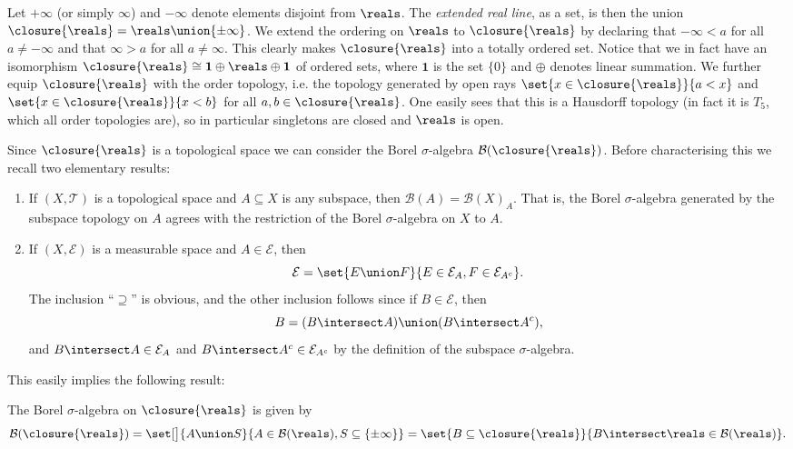 \documentclass[article, a4paper, 11pt, oneside]{memoir}
\numberwithin{equation}{chapter}
\newcommand{\calT}{\mathcal{T}}
\newcommand{\calE}{\mathcal{E}}
\newcommand{\borel}{\mathcal{B}}
\newcommand{\exreals}{\closure{\reals}}
\begin{document}
Let $+\infty$ (or simply $\infty$) and $-\infty$ denote elements disjoint from $\reals$. The \emph{extended real line}, as a set, is then the union $\exreals = \reals \union \{\pm\infty\}$. We extend the ordering on $\reals$ to $\exreals$ by declaring that $-\infty < a$ for all $a \neq -\infty$ and that $\infty > a$ for all $a \neq \infty$. This clearly makes $\exreals$ into a totally ordered set. Notice that we in fact have an isomorphism $\exreals \cong \mathbf{1} \oplus \reals \oplus \mathbf{1}$ of ordered sets, where $\mathbf{1}$ is the set $\{0\}$ and $\oplus$ denotes linear summation. We further equip $\exreals$ with the order topology, i.e. the topology generated by open rays $\set{x \in \exreals}{a < x}$ and $\set{x \in \exreals}{x < b}$ for all $a,b \in \exreals$. One easily sees that this is a Hausdorff topology (in fact it is $T_5$, which all order topologies are), so in particular singletons are closed and $\reals$ is open.

Since $\exreals$ is a topological space we can consider the Borel $\sigma$-algebra $\borel(\exreals)$. Before characterising this we recall two elementary results:
%
\begin{enumerate}
    \item If $(X,\calT)$ is a topological space and $A \subseteq X$ is any subspace, then $\borel(A) = \borel(X)_A$. That is, the Borel $\sigma$-algebra generated by the subspace topology on $A$ agrees with the restriction of the Borel $\sigma$-algebra on $X$ to $A$.

    \item If $(X,\calE)$ is a measurable space and $A \in \calE$, then
    \begin{equation*}
        \calE
            = \set{E \union F}{E \in \calE_A, F \in \calE_{A^c}}.
    \end{equation*}
    The inclusion \enquote{$\supseteq$} is obvious, and the other inclusion follows since if $B \in \calE$, then
    \begin{equation*}
        B
            = (B \intersect A) \union (B \intersect A^c),
    \end{equation*}
    and $B \intersect A \in \calE_A$ and $B \intersect A^c \in \calE_{A^c}$ by the definition of the subspace $\sigma$-algebra.
\end{enumerate}
%
This easily implies the following result:

\begin{proposition}
    The Borel $\sigma$-algebra on $\exreals$ is given by
    \begin{equation*}
        \borel(\exreals)
            = \set[\big]{A \union S}{A \in \borel(\reals), S \subseteq \{\pm\infty\}}
            = \set{B \subseteq \exreals}{B \intersect \reals \in \borel(\reals)}.
    \end{equation*}
\end{proposition}
\end{document}
